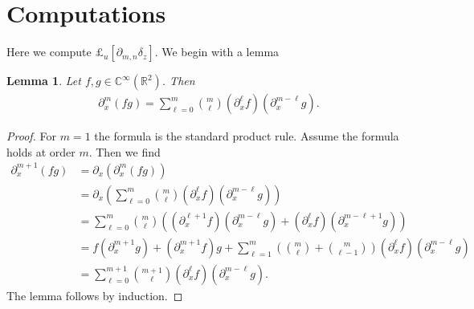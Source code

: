 \documentclass[12pt]{amsart}
\newcommand{\R}{\ensuremath{\mathbb{R}}}
\newtheorem{lem}[thm]{Lemma}
\begin{document}


\appendix
\section{Computations}
\label{app:computation}

Here we compute $\pounds_u [\partial_{m,n} \delta_z]$.
We begin with a lemma
\begin{lem}
  Let $f,g \in \mathbb{C}^\infty(\R^2)$.  Then
  \begin{align*}
    \partial_x^m ( fg) = \sum_{\ell=0}^{m} \binom{m}{\ell} (\partial_x^\ell f)(\partial_x^{m-\ell}g).
  \end{align*}
\end{lem}
\begin{proof}
  For $m=1$ the formula is the standard product rule.
  Assume the formula holds at order $m$.
  Then we find
  \begin{align*}
    \partial_x^{m+1} (fg) &= \partial_x ( \partial_x^{m}(fg)) \\
    &= \partial_x \left( \sum_{\ell=0}^{m} \binom{m}{\ell} (\partial_x^\ell f)(\partial_x^{m-\ell}g) \right) \\
    &= \sum_{\ell=0}^{m} \binom{m}{\ell}\left(
      ( \partial_x^{\ell + 1} f) (\partial_x^{m-\ell}g) 
      + ( \partial_x^{\ell} f) (\partial_x^{m-\ell+1}g)
      \right) \\
     &= f (\partial_x^{m+1}g) +(\partial_x^{m+1}f) g + \sum_{\ell=1}^{m} \left( \binom{m}{\ell} + \binom{m}{\ell-1} \right) (\partial_x^\ell f)(\partial_x^{m-\ell}g) \\
     &= \sum_{\ell=0}^{m+1} \binom{m+1}{\ell} (\partial_x^\ell f)(\partial_x^{m-\ell}g).
  \end{align*}
  The lemma follows by induction.
\end{proof}
\end{document}
